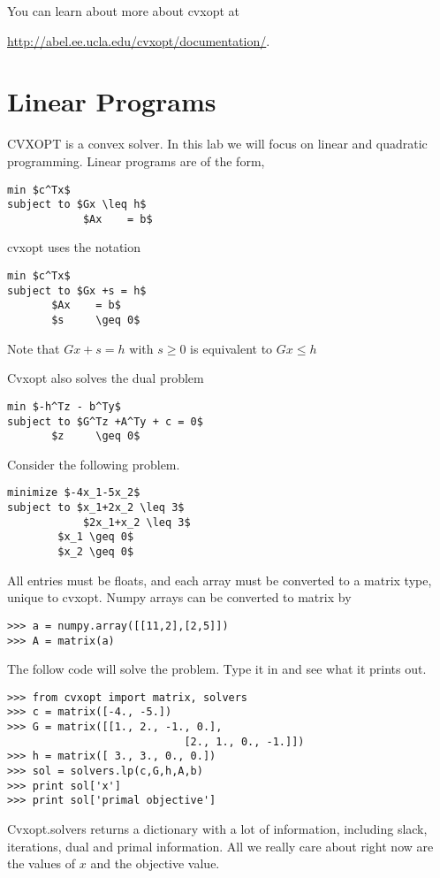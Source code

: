 \label{lab:Optimization 2}

You can learn about more about cvxopt at  

\url{http://abel.ee.ucla.edu/cvxopt/documentation/}.

\section*{Linear Programs}

CVXOPT is a convex solver. In this lab we will focus on linear and quadratic programming.
Linear programs are of the form, 

\begin{lstlisting}[mathescape]
min $c^Tx$
subject to $Gx \leq h$
	        $Ax    = b$
\end{lstlisting}

cvxopt uses the notation

\begin{lstlisting}[mathescape]
min $c^Tx$
subject to $Gx +s = h$
	   $Ax    = b$
	   $s     \geq 0$
\end{lstlisting}

Note that $Gx +s = h$ with $s  \geq 0$ is equivalent to $Gx \leq h$

Cvxopt also solves the dual problem

\begin{lstlisting}[mathescape]
min $-h^Tz - b^Ty$
subject to $G^Tz +A^Ty + c = 0$
	   $z     \geq 0$
\end{lstlisting}

Consider the following problem.
\begin{lstlisting}[mathescape]
minimize $-4x_1-5x_2$
subject to $x_1+2x_2 \leq 3$
	        $2x_1+x_2 \leq 3$
		$x_1 \geq 0$
		$x_2 \geq 0$
\end{lstlisting}
All entries must be floats, and each array must be converted to a matrix type, unique to cvxopt.
Numpy arrays can be converted to matrix by

\begin{lstlisting}
>>> a = numpy.array([[11,2],[2,5]])
>>> A = matrix(a)
\end{lstlisting}

The follow code will solve the problem. Type it in and see what it prints out.
\begin{lstlisting}
>>> from cvxopt import matrix, solvers
>>> c = matrix([-4., -5.])
>>> G = matrix([[1., 2., -1., 0.],
                            [2., 1., 0., -1.]])
>>> h = matrix([ 3., 3., 0., 0.])
>>> sol = solvers.lp(c,G,h,A,b)  
>>> print sol['x']
>>> print sol['primal objective']
\end{lstlisting}
Cvxopt.solvers returns a dictionary with a lot of information, including slack, iterations, dual and primal information.
All we really care about right now are the values of $x$ and the objective value.

